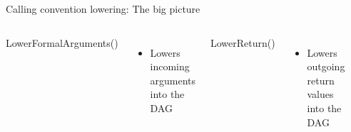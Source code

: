 
\begin{frame}[fragile]{Calling convention lowering: The big picture}

\begin{columns}[t]
    LowerFormalArguments()
    \begin{itemize}
        \item Lowers incoming arguments into the DAG
    \end{itemize}

    LowerReturn()
    \begin{itemize}
        \item Lowers outgoing return values into the DAG
    \end{itemize}
    
    \begin{figure}
        \vspace{-5ex}
        \includegraphics[width = 1.0\textwidth]{examples/ex1b/ex1b-pre-isel.pdf}
    \end{figure}
\end{columns}    

\end{frame}

